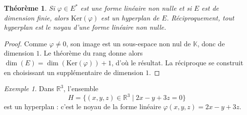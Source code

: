 \documentclass[11pt,a4paper]{article}
\newtheorem{theoreme}[definition]{Théorème}
\theoremstyle{remark}
\newtheorem{exemple}[definition]{Exemple}
\newcommand{\R}{\mathbb{R}}
\newcommand{\K}{\mathbb{K}}
\newcommand{\Ker}{\mathrm{Ker}}
\begin{document}
\begin{theoreme}
Si \(\varphi\in E^\ast\) est une forme linéaire non nulle et si \(E\) est de dimension finie, alors
\(\Ker(\varphi)\) est un hyperplan de \(E\).
Réciproquement, tout hyperplan est le noyau d’une forme linéaire non nulle.
\end{theoreme}

\begin{proof}
Comme \(\varphi\neq 0\), son image est un sous-espace non nul de \(\K\), donc de dimension \(1\).
Le théorème du rang donne alors \(\dim(E)=\dim(\Ker(\varphi))+1\), d’où le résultat.
La réciproque se construit en choisissant un supplémentaire de dimension \(1\).
\end{proof}

\begin{exemple}
Dans \(\R^3\), l’ensemble
\[
H=\{(x,y,z)\in\R^3\mid 2x-y+3z=0\}
\]
est un hyperplan : c’est le noyau de la forme linéaire \(\varphi(x,y,z)=2x-y+3z\).
\end{exemple}
\end{document}
